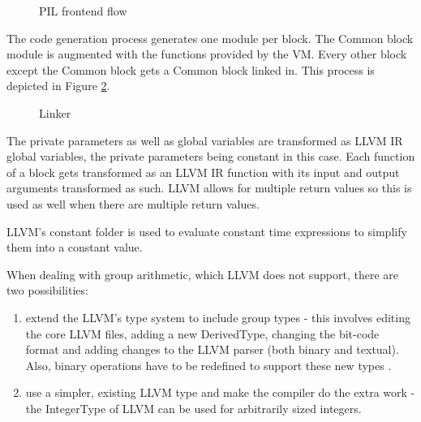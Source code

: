 \begin{figure}[hb!]  
  \caption{PIL frontend flow}
  \label{fig:pil_frontend_flow}
\end{figure}

The code generation process generates one module per block. The Common
block module is augmented with the functions provided by the VM.
Every other block except the Common block gets a Common block linked
in. This process is depicted in Figure \ref{fig:linker}.

\begin{figure}[hb!]
  \centering
  \caption{Linker}
  \label{fig:linker}
\end{figure}

The private parameters as well as global variables are transformed as
LLVM IR global variables, the private parameters being constant in
this case. Each function of a block gets transformed as an LLVM IR
function with its input and output arguments transformed as such. LLVM
allows for multiple return values so this is used as well when there
are multiple return values.

LLVM's constant folder is used to evaluate constant time expressions
to simplify them into a constant value.

When dealing with group arithmetic, which LLVM does not support, there are
two possibilities:
\begin{enumerate}
\item extend the LLVM's type system to include group types - this
  involves editing the core LLVM files, adding a new DerivedType,
  changing the bit-code format and adding changes to the LLVM parser
  (both binary and textual). Also, binary operations have to be redefined
  to support these new types \cite{extending_llvm}.
\item use a simpler, existing LLVM type and make the compiler do the
  extra work - the IntegerType of LLVM can be used for arbitrarily sized
  integers.
\end{enumerate}


